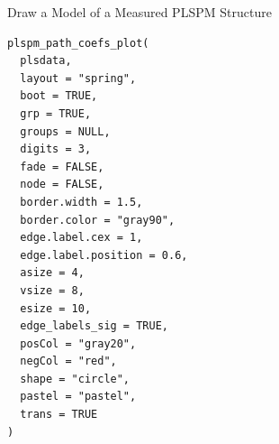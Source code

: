 \documentclass[a4paper]{book}
\begin{document}
%
\begin{Description}
Draw a Model of a Measured PLSPM Structure
\end{Description}
%
\begin{Usage}
\begin{verbatim}
plspm_path_coefs_plot(
  plsdata,
  layout = "spring",
  boot = TRUE,
  grp = TRUE,
  groups = NULL,
  digits = 3,
  fade = FALSE,
  node = FALSE,
  border.width = 1.5,
  border.color = "gray90",
  edge.label.cex = 1,
  edge.label.position = 0.6,
  asize = 4,
  vsize = 8,
  esize = 10,
  edge_labels_sig = TRUE,
  posCol = "gray20",
  negCol = "red",
  shape = "circle",
  pastel = "pastel",
  trans = TRUE
)
\end{verbatim}
\end{Usage}
%
\end{document}
